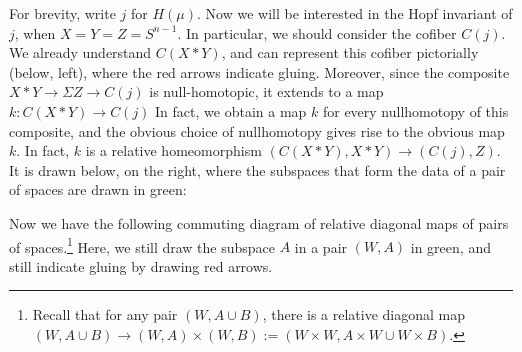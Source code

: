 \documentclass{article}
\newcommand{\Suspend}{\Sigma}
\newcommand{\HopfDiagram}[6]{
\ifthenelse{\equal{#1}{on}}
{\colorlet{LeftBar}{green}}
{\colorlet{LeftBar}{black}}
\ifthenelse{\equal{#2}{on}}
{\colorlet{BottomBar}{green}}
{\colorlet{BottomBar}{black}}
\ifthenelse{\equal{#1}{on}\OR \equal{#2}{on}}
{\colorlet{TheDot}{green}}
{\colorlet{TheDot}{black}}
\ifthenelse{\equal{#3}{BlackBeard}}
{\colorlet{GlueColor}{black}}
{\colorlet{GlueColor}{red}}
\ifthenelse{\equal{#3}{WhiteBeard}}
{\colorlet{GlueColor}{white}}
{}

\ifthenelse{\equal{#6}{cone}}
{\foreach \i in {0,...,9}
{\draw (#4+0,.1*\i+#5) -- (#4+1-.1*\i,1+#5);}
\foreach \i in {1,...,9}
{\draw (#4+.1*\i,0+#5) -- (#4+1,1-.1*\i+#5);}
\draw (#4+1,0+#5) -- (#4+1,1+#5);
\draw (#4+0,1+#5) -- (#4+1,1+#5);
}{}

\ifthenelse{\equal{#3}{WhiteBeard}}{}
{
\ifthenelse{\equal{#6}{nojoin}}{}
{
\ifthenelse{\equal{#6}{BottomBar}}{}
{\draw[ultra thick,LeftBar] (#4+0,0+#5) -- (#4+0,1+#5);}
\ifthenelse{\equal{#6}{LeftBar}}{}
{\draw[ultra thick,BottomBar] (#4+0,0+#5) -- (#4+1,0+#5)};
\fill[TheDot] (#4+0,0+#5) circle (3.42pt);
}
}

\ifthenelse{\equal{#3}{ArrowBeard}\OR \equal{#3}{BlackBeard}\OR \equal{#3}{WhiteBeard}}
{
\ifthenelse{\equal{#6}{BottomBar}}{}
{\draw[ultra thick,LeftBar] (#4+-.5,-.5+#5) -- (#4+-.5,1+#5);}
\ifthenelse{\equal{#6}{LeftBar}}{}
{\draw[ultra thick,BottomBar] (#4+-.5,-.5+#5) -- (#4+1,-.5+#5);}
\fill[TheDot] (#4+-.5,-.5+#5) circle (3.4pt);
\foreach \i in {0,2,4,6,8,10}
{\draw[->,GlueColor] (#4+-.1+.11*\i,-.1+#5) -- (#4+-.4+.14*\i,-.4+#5);}
\foreach \i in {2,4,6,8,10}
{\draw[->,GlueColor] (#4+-.1,-.1+.11*\i+#5) -- (#4+-.4,-.4+.14*\i+#5);}
}{}%
}
\begin{document}
For brevity, write $j$ for $H(\mu)$. Now we will be interested in the Hopf invariant of $j$, when $X=Y=Z=S^{n-1}$. In particular, we should consider the cofiber $C(j)$. We already understand $C(X\ast Y)$, and can represent this cofiber pictorially (below, left), where the red arrows indicate gluing. Moreover, since the composite $X \ast Y \to \Suspend Z \to C(j)$ is null-homotopic, it extends to a  map $k:C(X\ast Y)\to C(j)$
In fact, we obtain a map $k$ for every nullhomotopy of this composite, and the obvious choice of nullhomotopy gives rise to the obvious map $k$.
In fact, $k$ is a relative homeomorphism $(C(X\ast Y),X\ast Y)\to (C(j),Z)$. It is drawn below, on the right, where the subspaces that form the data of a pair of spaces are drawn in green:
\begin{center}
\end{center}
%
%
Now we have the following commuting diagram of relative diagonal maps of pairs of spaces.\footnote{Recall that for any pair $(W,A\cup B)$, there is a relative diagonal map $(W,A\cup B)\to (W,A)\times (W,B):=(W\times W,A\times W\cup W\times B)$.} Here, we still draw the subspace $A$ in a pair $(W,A)$ in green, and still indicate gluing by drawing red arrows. 
\end{document}
